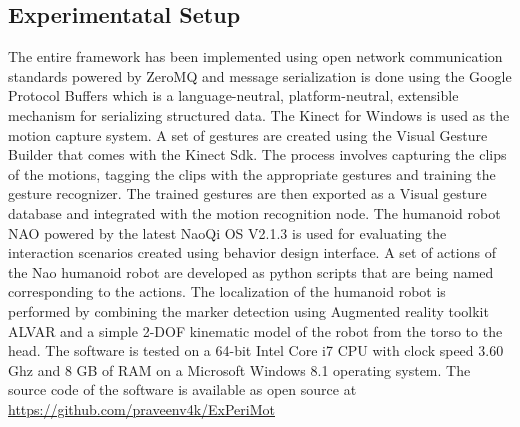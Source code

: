 \documentclass{llncs}
\begin{document}
\subsection{Experimentatal Setup}
The entire framework has been implemented using open network communication standards powered by ZeroMQ\cite{ZeroMQ} and message serialization is done using the Google Protocol Buffers\cite{ProtocolBuffers} which is a language-neutral, platform-neutral, extensible mechanism for serializing structured data. The Kinect for Windows is used as the motion capture system. A set of gestures are created using the Visual Gesture Builder that comes with the Kinect Sdk\cite{Kinect2014}. The process involves capturing the clips of the motions, tagging the clips with the appropriate gestures and training the gesture recognizer. The trained gestures are then exported as a Visual gesture database and integrated with the motion recognition node. The humanoid robot NAO powered by the latest NaoQi OS V2.1.3 is used for evaluating the interaction scenarios created using behavior design interface.  A set of actions of the Nao humanoid robot are developed as python scripts that are being named corresponding to the actions. The localization of the humanoid robot is performed by combining the marker detection using Augmented reality toolkit ALVAR\cite{ALVAR} and a simple 2-DOF kinematic model of the robot from the torso to the head. The software is tested on a 64-bit Intel Core i7 CPU with clock speed 3.60 Ghz and 8 GB of RAM on a  Microsoft Windows 8.1 operating system. The source code of the software is available as open source at \url{https://github.com/praveenv4k/ExPeriMot}
\end{document}
